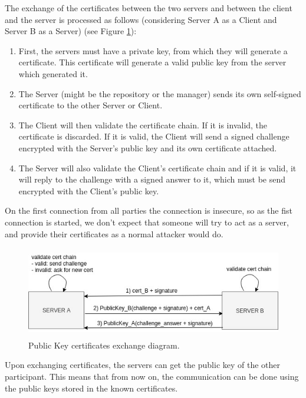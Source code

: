 The exchange of the certificates between the two servers and between the client and the server is processed as follows (considering Server A as a Client and Server B as a Server) (see Figure \ref{fig:pubkeyexchange}):
\begin{enumerate}[font=\bfseries]
    \item First, the servers must have a private key, from which they will generate a certificate. This certificate will generate a valid public key from the server which generated it.
    \item The Server (might be the repository or the manager) sends its own self-signed certificate to the other Server or Client.
    \item The Client will then validate the certificate chain. If it is invalid, the certificate is discarded. If it is valid, the Client will send a signed challenge encrypted with the Server's public key and its own certificate attached.
    \item The Server will also validate the Client's certificate chain and if it is valid, it will reply to the challenge with a signed answer to it, which must be send encrypted with the Client's public key.
\end{enumerate}
On the first connection from all parties the connection is insecure, so as the fist connection is started, we don't expect that someone will try to act as a server, and provide their certificates as a normal attacker would do.

\begin{figure}[H]
\center
\includegraphics[height=4cm]{sections/img/certs.jpg}
\caption{Public Key certificates exchange diagram.}
\label{fig:pubkeyexchange}
\end{figure}
\vspace*{5mm}

Upon exchanging certificates, the servers can get the public key of the other participant. This means that from now on, the communication can be done using the public keys stored in the known certificates.

\vspace*{5mm}

